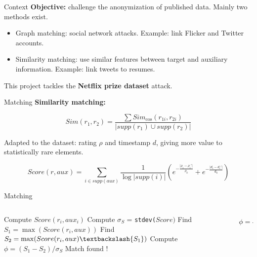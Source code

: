 \begin{frame}{Context}
	\textbf{Objective:} challenge the anonymization of published data. Mainly two methods exist.
	
	\begin{itemize}
		\item Graph matching: social network attacks. Example: link Flicker and Twitter accounts.
		
		\item Similarity matching: use similar features between target and auxiliary information. Example: link tweets to resumes.
	\end{itemize}

\begin{center}
	This project tackles the \textbf{Netflix prize dataset} attack.
\end{center}
	
\end{frame}


\begin{frame}{Matching}
	\textbf{Similarity matching:}

	\begin{equation*}
	Sim(r_1, r_2) = \frac{\sum Sim_{\text{cos}}(r_{1i}, r_{2i})}{\lvert supp(r_1) \cup supp(r_2) \rvert}
	\end{equation*} 

	Adapted to the dataset: rating $\rho$ and timestamp $d$, giving more value to statistically rare elements.

	\begin{equation*}
	Score(r,aux) = \sum_{i \in supp(aux)} \frac{1}{\log\lvert supp(i) \rvert} \left( e^{-\frac{ \lvert \rho_i - \rho_i'  \rvert}{\rho_0}} + e^{-\frac{\lvert d_i - d_i' \rvert}{d_0}}\right)
	\end{equation*}
\end{frame}

\begin{frame}{Matching}	
	\begin{columns}
		\begin{column}{.6\linewidth}
			
		\begin{algorithmic}[1]
		\State Compute $Score(r_i,aux_i)$
		\EndFor
		\State Compute $\sigma_S$ = \texttt{stdev(}$Score\texttt{)}$
		\State Find $S_1 = \max(Score(r_i, aux))$
		\State Find $S_2 = \max(Score(r_i, aux) \textbackslash \{S_1\})$
		\State Compute $\phi = (S_1-S_2)/\sigma_S$
		\State Match found !
		\EndIf
		\EndFor
	\end{algorithmic}
		\end{column}
	\begin{column}{.4\linewidth}
		\begin{equation*}
		\phi = \frac{S_1-S_2}{\sigma_S}
		\end{equation*}
		
	\end{column}
	\end{columns}

\end{frame}


